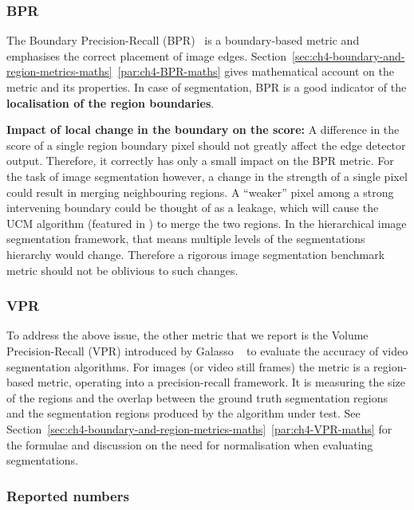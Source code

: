\subsubsection{BPR}
\label{sec:ch5-BPR-evaluation-metric}
The Boundary Precision-Recall (BPR)~\cite{Arbelaez11} is a boundary-based metric and emphasises the correct placement of image edges. Section~\ref*{sec:ch4-boundary-and-region-metrics-maths}~\ref{par:ch4-BPR-maths} %
gives mathematical account on the metric and its properties. In case of segmentation, BPR is a good indicator of the {\bf localisation of the region boundaries}.

\textbf{Impact of %
local change in the boundary on the score:} A difference in the score of a single region boundary pixel should not greatly affect the edge detector output. Therefore, it correctly has only a small impact on the BPR metric. For the task of image segmentation however, a change in the strength of a single pixel could result in merging neighbouring regions. A ``weaker'' pixel among a strong intervening boundary could be thought of as a leakage, which will cause the UCM algorithm (featured in ) %
to merge the two regions. In the hierarchical image segmentation framework, that means multiple levels of the segmentations hierarchy would change. Therefore a rigorous image segmentation benchmark metric should not be oblivious to such changes.

\subsubsection{VPR}
To address the above issue, the other metric that we report is the Volume Precision-Recall (VPR) introduced by Galasso \etal~\cite{Galasso13} to evaluate the accuracy of video segmentation algorithms. For images (or video still frames) the metric is a region-based metric, operating %
into a precision-recall framework. It is measuring the size of the regions and the overlap between the ground truth segmentation regions and the segmentation regions produced by the algorithm under test. 
See Section~\ref*{sec:ch4-boundary-and-region-metrics-maths}~\ref{par:ch4-VPR-maths} for the formulae and discussion on the need for normalisation when evaluating segmentations.

\subsubsection{Reported numbers}
